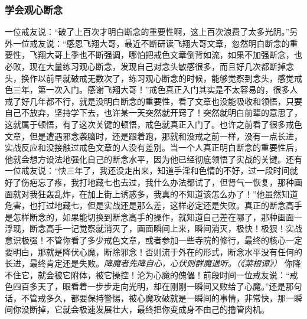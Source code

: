 \subsubsection{学会观心断念}

一位戒友说：“破了上百次才明白断念的重要性啊，这上百次浪费了太多光阴。”另外一位戒友说：“感恩飞翔大哥，最近不断研读飞翔大哥文章，忽然明白断念的重要性，飞翔大哥上季也不断强调，哪怕把戒色文章倒背如流，如果不加强断念，也必败，现在大量练习观心断念，发现自己对念头敏感很多，而且好几次都断掉念头，换作以前早就破戒无数次了，练习观心断念的时候，能够觉察到念头，感觉戒色三年，第一次入门。感谢飞翔大哥！”戒色真正入门其实是不太容易的，很多人戒了好几年都不行，就是没明白断念的重要性，看了文章也没能吸收和领悟，只要自己不放弃，坚持学下去，也许某一天突然就开窍了！突然就明白前辈的意思了，这就属于顿悟，有了这次关键的顿悟，戒色就真正入门了。也许之前看了很多戒色文章，但是遭遇邪念袭脑时，还是跟着跑，那就和没戒之前一样，没有一点长进，实战反应和没接触过戒色文章的人没有差别。当一个人真正明白断念的重要性后，他就会想方设法地强化自己的断念水平，因为他已经彻底领悟了实战的关键。还有一位戒友说：“快三年了，我还没走出来，知道手淫和色情的不好，过一段时间就好了伤疤忘了疼，我打地藏七也去过，我什么办法都试了，但肾气一恢复，那种画面就对我狂轰乱炸，在加上街上诱惑多，我真的不知道该怎么办了！”他虽然知道危害，也打过地藏七，但是实战还是那么差，这样必定还是失败。真正的断念高手是怎样断念的，如果能切换到断念高手的操作，就知道自己差在哪了，那种画面一浮现，断念高手一记觉察就消灭了，画面瞬间上来，瞬间消灭，极快！极狠！实战意识极强！不管你看了多少戒色文章，或者参加一些寺院的修行，最终的核心一定要明白，那就是降伏心魔，断除邪念！否则流于外在的形式，断念水平没有任何的长进，最终肯定还是失败。\textit{降魔者先降自心，心伏则群魔退听。（《菜根谭》）} 你降不住它，就会被它附体，被它操控！沦为心魔的傀儡！前段时间一位戒友说：“戒色四百多天了，眼看着一步步走向光明，却在刚刚一瞬间又败给了心魔。”还是那句话，不管戒多久，都要保持警惕，被心魔攻破就是一瞬间的事情，非常快，那一瞬间你没断掉，它就会极速发展壮大，最终把你变成身不由己的撸管肉机。

